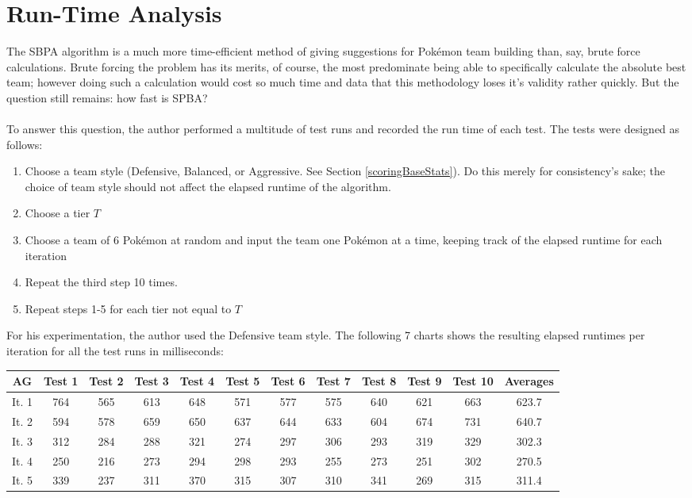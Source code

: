 \documentclass{article}
\begin{document}
\section{Run-Time Analysis}
The SBPA algorithm is a much more time-efficient method of giving suggestions for Pok\'emon team building than, say, brute force calculations. Brute forcing the problem has its merits, of course, the most predominate being able to specifically calculate the absolute best team; however doing such a calculation would cost so much time and data that this methodology loses it's validity rather quickly. But the question still remains: how fast is SPBA?\\\\
To answer this question, the author performed a multitude of test runs and recorded the run time of each test. The tests were designed as follows:
\begin{enumerate}
	\item Choose a team style (Defensive, Balanced, or Aggressive. See Section \ref{scoringBaseStats}). Do this merely for consistency's sake; the choice of team style should not affect the elapsed runtime of the algorithm.  
	\item Choose a tier $T$
	\item Choose a team of 6 Pok\'emon at random and input the team one Pok\'emon at a time, keeping track of the elapsed runtime for each iteration
	\item Repeat the third step 10 times.
	\item Repeat steps 1-5 for each tier not equal to $T$
\end{enumerate}
For his experimentation, the author used the Defensive team style. The following 7 charts shows the resulting elapsed runtimes per iteration for all the test runs in milliseconds:
\begin{center}
	\begin{tabular}{c||c|c|c|c|c|c|c|c|c|c||c}
		AG&Test 1&Test 2&Test 3&Test 4&Test 5&Test 6&Test 7&Test 8&Test 9&Test 10&Averages\\
		\hline\hline
		It. 1&764&565&613&648&571&577&575&640&621&663&623.7\\
		It. 2&594&578&659&650&637&644&633&604&674&731&640.7\\
		It. 3&312&284&288&321&274&297&306&293&319&329&302.3\\
		It. 4&250&216&273&294&298&293&255&273&251&302&270.5\\
		It. 5&339&237&311&370&315&307&310&341&269&315&311.4\\
	\end{tabular}
\end{center}
\end{document}
